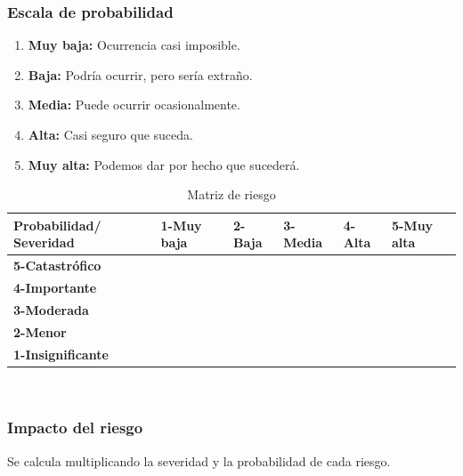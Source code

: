   \subsubsection{Escala de probabilidad}
  \begin{enumerate}
    \item \textbf{Muy baja:} Ocurrencia casi imposible.
    \item \textbf{Baja:} Podría ocurrir, pero sería extraño.
    \item \textbf{Media:} Puede ocurrir ocasionalmente.
    \item \textbf{Alta:} Casi seguro que suceda.
    \item \textbf{Muy alta:} Podemos dar por hecho que sucederá.
  \end{enumerate}

  \begin{table}[H]
\centering
\scriptsize
\begin{tabular}{|p{2cm}|p{2cm}|p{2cm}| p{2cm} |p{2cm}| p{2cm}|}
\hline \bf Probabilidad/ Severidad & \bf 1-Muy baja & \bf 2-Baja & \bf 3-Media & \bf 4-Alta & \bf 5-Muy alta\\ [10pt]

\hline \bf 5-Catastrófico & \cellcolor{yellow!50} & \cellcolor{red!50} & \cellcolor{red!50} & \cellcolor{red!50} &\cellcolor{red!50} \\ [10pt]

\hline \bf 4-Importante & \cellcolor{yellow!50} & \cellcolor{yellow!50} & \cellcolor{red!50} & \cellcolor{red!50} &\cellcolor{red!50} \\ [10pt]

\hline \bf 3-Moderada &\cellcolor{green!50} & \cellcolor{yellow!50} & \cellcolor{yellow!50} & \cellcolor{red!50} &\cellcolor{red!50} \\ [10pt]

\hline \bf 2-Menor & \cellcolor{green!50} & \cellcolor{green!50} & \cellcolor{yellow!50} &\cellcolor{yellow!50} &\cellcolor{red!50} \\ [10pt]

\hline \bf 1-Insignificante & \cellcolor{green!50} & \cellcolor{green!50} & \cellcolor{green!50} &\cellcolor{yellow!50} &\cellcolor{yellow!50} \\ [10pt]
\hline
\end{tabular} \\
\caption{Matriz de riesgo}
\end{table}
  
  \subsubsection{Impacto del riesgo}
    Se calcula multiplicando la severidad y la probabilidad de cada riesgo.



